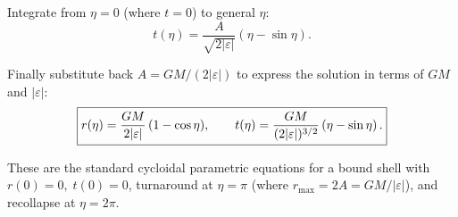 Integrate from \(\eta=0\) (where \(t=0\)) to general \(\eta\):
\[
t(\eta)=\frac{A}{\sqrt{2|\varepsilon|}}(\eta-\sin\eta).
\]

Finally substitute back \(A=GM/(2|\varepsilon|)\) to express the solution in terms of \(GM\) and \(|\varepsilon|\):
\[
\boxed{%
r(\eta)=\frac{GM}{2|\varepsilon|}\,(1-\cos\eta),\qquad
t(\eta)=\frac{GM}{(2|\varepsilon|)^{3/2}}\,(\eta-\sin\eta)\,.}
\]

These are the standard cycloidal parametric equations for a bound shell with \(r(0)=0,\;t(0)=0\),
turnaround at \(\eta=\pi\) (where \(r_{\max}=2A=GM/|\varepsilon|\)), and recollapse at \(\eta=2\pi\).

